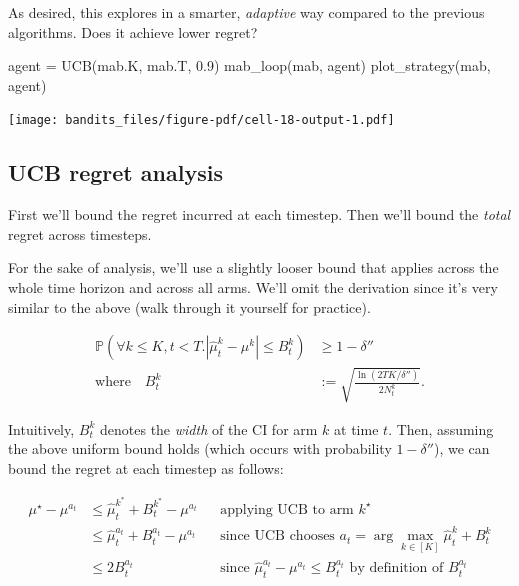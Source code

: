 \documentclass[
  letterpaper,
  DIV=11,
  numbers=noendperiod]{scrreprt}
\newenvironment{Shaded}{\begin{snugshade}}{\end{snugshade}}
\newcommand{\FloatTok}[1]{\textcolor[rgb]{0.68,0.00,0.00}{#1}}
\newcommand{\NormalTok}[1]{\textcolor[rgb]{0.00,0.23,0.31}{#1}}
\newcommand{\OperatorTok}[1]{\textcolor[rgb]{0.37,0.37,0.37}{#1}}
\theoremstyle{plain}
\theoremstyle{plain}
\theoremstyle{definition}
\theoremstyle{definition}
\theoremstyle{remark}
\begin{document}
As desired, this explores in a smarter, \emph{adaptive} way compared to
the previous algorithms. Does it achieve lower regret?

\begin{Shaded}
\begin{Highlighting}[]
\NormalTok{agent }\OperatorTok{=}\NormalTok{ UCB(mab.K, mab.T, }\FloatTok{0.9}\NormalTok{)}
\NormalTok{mab\_loop(mab, agent)}
\NormalTok{plot\_strategy(mab, agent)}
\end{Highlighting}
\end{Shaded}

\texttt{[image: bandits\_files/figure-pdf/cell-18-output-1.pdf]}

\subsection{UCB regret analysis}\label{ucb-regret-analysis}

First we'll bound the regret incurred at each timestep. Then we'll bound
the \emph{total} regret across timesteps.

For the sake of analysis, we'll use a slightly looser bound that applies
across the whole time horizon and across all arms. We'll omit the
derivation since it's very similar to the above (walk through it
yourself for practice).

\[
\begin{aligned}
    \mathbb{P}\left(\forall k \le K, t < T. |\hat \mu^k_t - \mu^k | \le B^k_t \right) &\ge 1-\delta'' \\
    \text{where} \quad B^k_t &:= \sqrt{\frac{\ln(2TK/\delta'')}{2N^k_t}}.
\end{aligned}
\]

Intuitively, \(B^k_t\) denotes the \emph{width} of the CI for arm \(k\)
at time \(t\). Then, assuming the above uniform bound holds (which
occurs with probability \(1-\delta''\)), we can bound the regret at each
timestep as follows:

\[
\begin{aligned}
    \mu^\star - \mu^{a_t} &\le \hat \mu^{k^*}_t + B_t^{k^*} - \mu^{a_t} && \text{applying UCB to arm } k^\star \\
    &\le \hat \mu^{a_t}_t + B^{a_t}_t - \mu^{a_t} && \text{since UCB chooses } a_t = \arg \max_{k \in [K]} \hat \mu^k_t + B_t^{k} \\
    &\le 2 B^{a_t}_t && \text{since } \hat \mu^{a_t}_t - \mu^{a_t} \le B^{a_t}_t \text{ by definition of } B^{a_t}_t \\
\end{aligned}
\]
\end{document}
